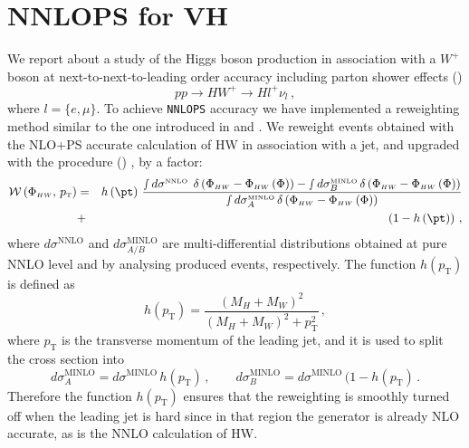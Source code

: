 \section{NNLOPS for VH}

We report about a study of the Higgs boson production in association with a $W^{+}$
boson at next-to-next-to-leading order accuracy including parton
shower effects (\NNLOPS{}) %
\begin{equation}
  pp\rightarrow HW^{+} \rightarrow H l^{+}\nu_{l}\,,
  \label{eq:def-process}
\end{equation}
where $l = \{e,\mu\}$.
To achieve \texttt{NNLOPS} accuracy we have implemented a reweighting
method similar to the one introduced in \HNNLOPS{}
\cite{Hamilton:2013fea} and \DYNNLOPS{} \cite{Karlberg:2014qua}. We
reweight events obtained with the \POWHEG{} NLO+PS accurate
calculation of HW in association with a jet, and upgraded with the
\MINLO{} procedure (\HWJMINLO{}) \cite{Luisoni:2013kna}, by a factor:
\begin{eqnarray} 
  \mathcal{W}\left(\PhiHWsimp,\, p_{{\scriptscriptstyle
      \mathrm{T}}}\right)&=&h\left(\pt\right)\,\frac{\smallint
    d\sigma^{{\scriptscriptstyle
        \mathrm{NNLO\phantom{i}}}}\,\delta\left(\PhiHWsimp-\PhiHWsimp\left(\Phi\right)\right)-\smallint
    d\sigma_{B}^{{\scriptscriptstyle
        \mathrm{MINLO}}}\,\delta\left(\PhiHWsimp-\PhiHWsimp\left(\Phi\right)\right)}{\smallint
    d\sigma_{A}^{{\scriptscriptstyle
        \mathrm{MINLO}}}\,\delta\left(\PhiHWsimp-\PhiHWsimp\left(\Phi\right)\right)}\nonumber\\ &+&\left(1-h\left(\pt\right)\right)\,,\label{eq:W}
\end{eqnarray}
where $d\sigma^{\mathrm{NNLO}}$ and $d\sigma_{A/B}^{\mathrm{MINLO}}$
are multi-differential distributions obtained at pure NNLO level and
by analysing produced \HWJMINLO{} events, respectively. The function
$h(p_{\scriptscriptstyle\mathrm{T}})$ is defined as
\begin{equation}
h(p_\mathrm{T}) = \frac{(M_{H}+M_W)^2}{(M_{H}+M_W)^2+p_\mathrm{T}^2}\,, \label{eq:h_pt}
\end{equation}
where $p_{\scriptscriptstyle\mathrm{T}}$ is the transverse momentum of
the leading jet, and it is used to split the \MINLO{} cross section
into
%
\begin{equation} d\sigma_A^{\scriptscriptstyle\mathrm{MINLO}} =d
\sigma^{\scriptscriptstyle\mathrm{MINLO}}\,
h(p_{\scriptscriptstyle\mathrm{T}})\,,\qquad
d\sigma_B^{\scriptscriptstyle\mathrm{MINLO}} =
d\sigma^{\scriptscriptstyle\mathrm{MINLO}}\,
(1-h(p_{\scriptscriptstyle\mathrm{T}})\,.
\end{equation}
Therefore the function $h(p_{\scriptscriptstyle\mathrm{T}})$ ensures that the
reweighting is smoothly turned off when the leading jet is hard since
in that region the \HWJMINLO{} generator is already NLO accurate, as
is the NNLO calculation of HW.

